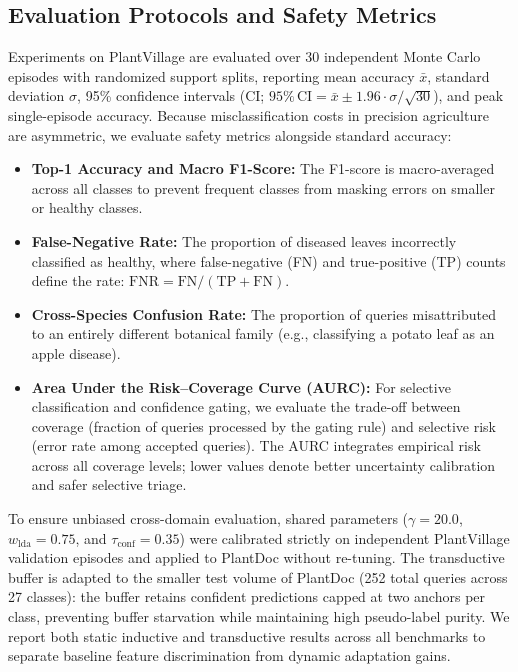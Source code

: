 \documentclass[preprint,12pt]{elsarticle}
\begin{document}
\subsection{Evaluation Protocols and Safety Metrics}
\label{sec:metrics}
Experiments on PlantVillage are evaluated over 30 independent Monte Carlo episodes with randomized support splits, reporting mean accuracy $\bar{x}$, standard deviation $\sigma$, 95\% confidence intervals (CI; $95\%\,\text{CI} = \bar{x} \pm 1.96 \cdot \sigma / \sqrt{30}$), and peak single-episode accuracy. Because misclassification costs in precision agriculture are asymmetric, we evaluate safety metrics alongside standard accuracy:
\begin{itemize}
    \item \textbf{Top-1 Accuracy and Macro F1-Score:} The F1-score is macro-averaged across all classes to prevent frequent classes from masking errors on smaller or healthy classes.
    \item \textbf{False-Negative Rate:} The proportion of diseased leaves incorrectly classified as healthy, where false-negative (FN) and true-positive (TP) counts define the rate: $\text{FNR} = \text{FN} / (\text{TP} + \text{FN})$.
    \item \textbf{Cross-Species Confusion Rate:} The proportion of queries misattributed to an entirely different botanical family (e.g., classifying a potato leaf as an apple disease).
    \item \textbf{Area Under the Risk--Coverage Curve (AURC):} For selective classification and confidence gating, we evaluate the trade-off between coverage (fraction of queries processed by the gating rule) and selective risk (error rate among accepted queries). The AURC integrates empirical risk across all coverage levels; lower values denote better uncertainty calibration and safer selective triage.
\end{itemize}

To ensure unbiased cross-domain evaluation, shared parameters ($\gamma = 20.0$, $w_{\text{lda}} = 0.75$, and $\tau_{\text{conf}} = 0.35$) were calibrated strictly on independent PlantVillage validation episodes and applied to PlantDoc without re-tuning. The transductive buffer is adapted to the smaller test volume of PlantDoc (252 total queries across 27 classes): the buffer retains confident predictions capped at two anchors per class, preventing buffer starvation while maintaining high pseudo-label purity. We report both static inductive and transductive results across all benchmarks to separate baseline feature discrimination from dynamic adaptation gains.
\end{document}
